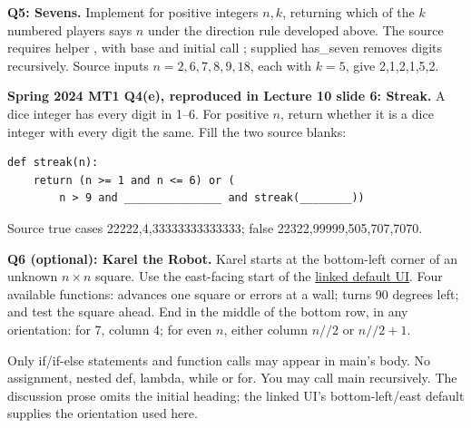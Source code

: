 \begin{prob}
\textbf{Q5: Sevens.} Implement  for positive integers $n,k$, returning which of the $k$ numbered players says $n$ under the direction rule developed above. The source requires helper , with base  and initial call ; supplied has\_seven removes digits recursively. Source inputs $n=2,6,7,8,9,18$, each with $k=5$, give 2,1,2,1,5,2.\par
{}
\end{prob}
\begin{prob}
\textbf{Spring 2024 MT1 Q4(e), reproduced in Lecture 10 slide 6: Streak.} A dice integer has every digit in 1--6. For positive $n$, return whether it is a dice integer with every digit the same. Fill the two source blanks:
\begin{lstlisting}
def streak(n):
    return (n >= 1 and n <= 6) or (
        n > 9 and _______________ and streak(________))
\end{lstlisting}
Source true cases 22222,4,33333333333333; false 22322,99999,505,707,7070.\par
{}
\end{prob}
\begin{prob}
\textbf{Q6 (optional): Karel the Robot.} Karel starts at the bottom-left corner of an unknown $n\times n$ square. Use the east-facing start of the \href{https://compedu.stanford.edu/karel-reader/docs/python/en/ide.html}{linked default UI}. Four available functions:  advances one square or errors at a wall;  turns 90 degrees left;  and  test the square ahead. End in the middle of the bottom row, in any orientation: for 7, column 4; for even $n$, either column $n//2$ or $n//2+1$.

Only if/if-else statements and function calls may appear in main's body. No assignment, nested def, lambda, while or for. You may call main recursively. The discussion prose omits the initial heading; the linked UI's bottom-left/east default supplies the orientation used here.\par
{}
\end{prob}

